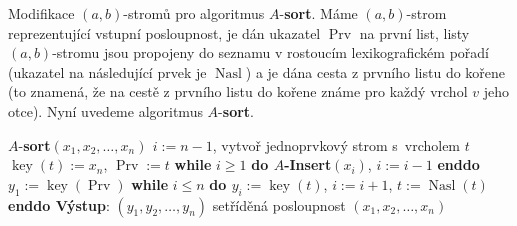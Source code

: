 \documentclass[a4paper,12pt]{article}
\DeclareMathOperator*{\Prv}{Prv}
\DeclareMathOperator*{\Nasl}{Nasl}
\DeclareMathOperator*{\key}{key}
\newcommand{\algoritmus}[1]{
  {
  \setlength\fboxrule{0.5pt}

  \begin{boxedminipage}{0.8\textwidth}

 #1
  \end{boxedminipage}

  }
  }
\begin{document}
Modifikace $(a,b)$-stromů pro algoritmus 
$A$-{\bf sort}. Máme $(a,b)$-strom reprezentující vstupní 
posloupnost, je dán ukazatel $\Prv$ na první list, listy 
$(a,b)$-stromu jsou propojeny do seznamu v rostoucím 
lexikografickém pořadí (ukazatel na následující prvek je 
$\Nasl$) a je dána cesta z prvního listu do kořene (to 
znamená, že na cestě z prvního listu do kořene známe 
pro každý vrchol $v$ jeho otce). Nyní uvedeme algoritmus 
$A$-{\bf sort}.
 
\algoritmus{
$A$-{\bf sort$(x_1,x_2,\dots,x_n)$\newline 
$i:=n-1$}, vytvoř jednoprvkový strom s~vrcholem $t$\newline 
$\key(t):=x_n$, $\Prv:=t$\newline 
{\bf \textsf{while}} $i\ge 1$ {\bf \textsf{do} $A$-Insert$(x_i)$}, $i:=i-1$ {\bf \textsf{enddo}}\newline 
$y_1:=\key(\Prv)$\newline 
{\bf \textsf{while}} $i\le n$ {\bf \textsf{do}\newline 
\phantom{---}$y_i:=\key(t)$}, $i:=i+1$, $t:=\Nasl(t)$\newline 
{\bf \textsf{enddo}\newline 
Výstup}: $(y_1,y_2,\dots,y_n)$ setříděná posloupnost $
(x_1,x_2,\dots,x_n)$
}
\end{document}
